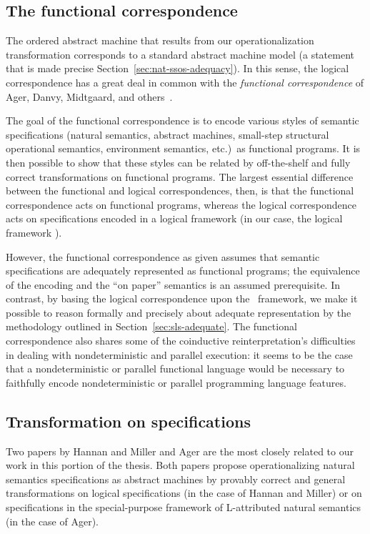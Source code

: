 \subsection*{The functional correspondence}

The ordered abstract machine that results from our operationalization
transformation corresponds to a standard abstract machine model (a
statement that is made precise
Section~\ref{sec:nat-ssos-adequacy}). In this sense, the logical
correspondence has a great deal in common with the {\it functional
  correspondence} of Ager, Danvy, Midtgaard, and
others~\cite{ager03functional,ager04functional,ager05functional,
  danvy08defunctionalized,danvy12interderiving}. 

The goal of the functional correspondence is to encode various styles
of semantic specifications (natural semantics, abstract machines,
small-step structural operational semantics, environment semantics,
etc.)~as functional programs. It is then possible to show that these
styles can be related by off-the-shelf and fully correct
transformations on functional programs. The largest essential
difference between the functional and logical correspondences, then,
is that the functional correspondence acts on functional programs,
whereas the logical correspondence acts on specifications encoded in a
logical framework (in our case, the logical framework \sls).

However, the functional correspondence as given assumes that semantic
specifications are adequately represented as functional programs; the
equivalence of the encoding and the ``on paper'' semantics is an
assumed prerequisite. In contrast, by basing the logical
correspondence upon the \sls~framework, we make it possible to reason
formally and precisely about adequate representation by the
methodology outlined in Section~\ref{sec:sls-adequate}. The functional
correspondence also shares some of the coinductive reinterpretation's
difficulties in dealing with nondeterministic and parallel execution:
it seems to be the case that a nondeterministic or parallel functional
language would be necessary to faithfully encode nondeterministic or
parallel programming language features.

\subsection*{Transformation on specifications}

Two papers by Hannan and Miller \cite{hannan92operational} and Ager
\cite{ager04natural} are the most closely related to our work in this
portion of the thesis. Both papers propose operationalizing natural
semantics specifications as abstract machines by provably correct and
general transformations on logical specifications (in the case of
Hannan and Miller) or on specifications in the special-purpose
framework of L-attributed natural semantics (in the case of Ager).


